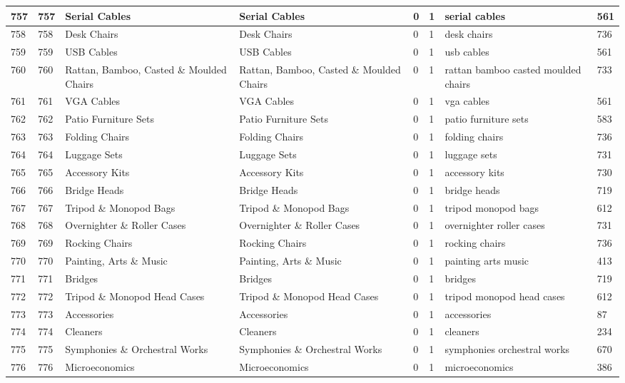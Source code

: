 \begin{longtable}{|l|l|l|l|l|l|l|l|}
757 & 757 & Serial Cables & Serial Cables & 0 & 1 & serial cables & 561 \\ \hline 
758 & 758 & Desk Chairs & Desk Chairs & 0 & 1 & desk chairs & 736 \\ \hline 
759 & 759 & USB Cables & USB Cables & 0 & 1 & usb cables & 561 \\ \hline 
760 & 760 & Rattan, Bamboo, Casted \& Moulded Chairs & Rattan, Bamboo, Casted \& Moulded Chairs & 0 & 1 & rattan bamboo casted moulded chairs & 733 \\ \hline 
761 & 761 & VGA Cables & VGA Cables & 0 & 1 & vga cables & 561 \\ \hline 
762 & 762 & Patio Furniture Sets & Patio Furniture Sets & 0 & 1 & patio furniture sets & 583 \\ \hline 
763 & 763 & Folding Chairs & Folding Chairs & 0 & 1 & folding chairs & 736 \\ \hline 
764 & 764 & Luggage Sets & Luggage Sets & 0 & 1 & luggage sets & 731 \\ \hline 
765 & 765 & Accessory Kits & Accessory Kits & 0 & 1 & accessory kits & 730 \\ \hline 
766 & 766 & Bridge Heads & Bridge Heads & 0 & 1 & bridge heads & 719 \\ \hline 
767 & 767 & Tripod \& Monopod Bags & Tripod \& Monopod Bags & 0 & 1 & tripod monopod bags & 612 \\ \hline 
768 & 768 & Overnighter \& Roller Cases & Overnighter \& Roller Cases & 0 & 1 & overnighter roller cases & 731 \\ \hline 
769 & 769 & Rocking Chairs & Rocking Chairs & 0 & 1 & rocking chairs & 736 \\ \hline 
770 & 770 & Painting, Arts \& Music & Painting, Arts \& Music & 0 & 1 & painting arts music & 413 \\ \hline 
771 & 771 & Bridges & Bridges & 0 & 1 & bridges & 719 \\ \hline 
772 & 772 & Tripod \& Monopod Head Cases & Tripod \& Monopod Head Cases & 0 & 1 & tripod monopod head cases & 612 \\ \hline 
773 & 773 & Accessories & Accessories & 0 & 1 & accessories & 87 \\ \hline 
774 & 774 & Cleaners & Cleaners & 0 & 1 & cleaners & 234 \\ \hline 
775 & 775 & Symphonies \& Orchestral Works & Symphonies \& Orchestral Works & 0 & 1 & symphonies orchestral works & 670 \\ \hline 
776 & 776 & Microeconomics & Microeconomics & 0 & 1 & microeconomics & 386 \\ \hline 

\end{longtable}

